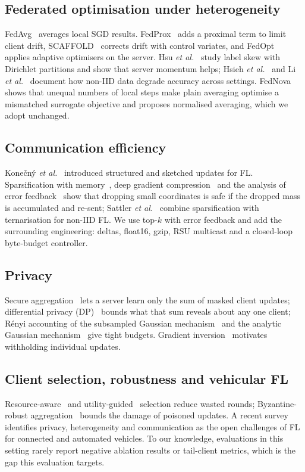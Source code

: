 \documentclass[journal]{IEEEtran}
\begin{document}
\subsection{Federated optimisation under heterogeneity}
FedAvg~\cite{mcmahan2017fedavg} averages local SGD results. FedProx~\cite{li2020fedprox} adds a proximal term to limit client drift, SCAFFOLD~\cite{karimireddy2020scaffold} corrects drift with control variates, and FedOpt~\cite{reddi2021fedopt} applies adaptive optimisers on the server. Hsu \emph{et al.}~\cite{hsu2019noniid} study label skew with Dirichlet partitions and show that server momentum helps; Hsieh \emph{et al.}~\cite{hsieh2020quagmire} and Li \emph{et al.}~\cite{li2022niidbench} document how non-IID data degrade accuracy across settings. FedNova~\cite{wang2020fednova} shows that unequal numbers of local steps make plain averaging optimise a mismatched surrogate objective and proposes normalised averaging, which we adopt unchanged.

\subsection{Communication efficiency}
Kone\v{c}n\'y \emph{et al.}~\cite{konecny2016strategies} introduced structured and sketched updates for FL. Sparsification with memory~\cite{stich2018sparsified}, deep gradient compression~\cite{lin2018dgc} and the analysis of error feedback~\cite{karimireddy2019ef} show that dropping small coordinates is safe if the dropped mass is accumulated and re-sent; Sattler \emph{et al.}~\cite{sattler2020robust} combine sparsification with ternarisation for non-IID FL. We use top-$k$ with error feedback and add the surrounding engineering: deltas, float16, gzip, RSU multicast and a closed-loop byte-budget controller.

\subsection{Privacy}
Secure aggregation~\cite{bonawitz2017secagg} lets a server learn only the sum of masked client updates; differential privacy (DP)~\cite{abadi2016dpsgd} bounds what that sum reveals about any one client; R\'enyi accounting of the subsampled Gaussian mechanism~\cite{mironov2017rdp,mironov2019sgm} and the analytic Gaussian mechanism~\cite{balle2018analytic} give tight budgets. Gradient inversion~\cite{zhu2019dlg} motivates withholding individual updates.

\subsection{Client selection, robustness and vehicular FL}
Resource-aware~\cite{nishio2019fedcs} and utility-guided~\cite{lai2021oort} selection reduce wasted rounds; Byzantine-robust aggregation~\cite{yin2018byzantine} bounds the damage of poisoned updates. A recent survey~\cite{chellapandi2023cav} identifies privacy, heterogeneity and communication as the open challenges of FL for connected and automated vehicles. To our knowledge, evaluations in this setting rarely report negative ablation results or tail-client metrics, which is the gap this evaluation targets.
\end{document}
